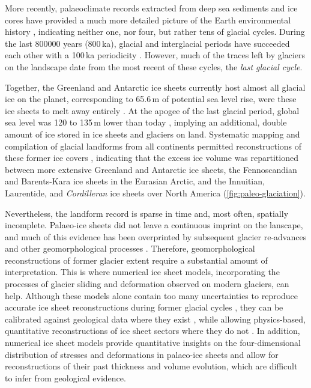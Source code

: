 \documentclass{article}
\begin{document}
More recently, palaeoclimate records extracted from deep sea sediments and ice
cores have provided a much more detailed picture of the Earth environmental
history \citep[e.g.,][]{Emiliani.1955, Shackleton.Opdyke.1973,
Dansgaard.etal.1993, Augustin.etal.2004}, indicating neither one, nor four, but
rather tens of glacial cycles. During the last 800000 years (800\,ka), glacial
and interglacial periods have succeeded each other with a 100\,ka periodicity
\citep[\cref{fig:paleo-timeseries};]{Hays.etal.1976, Augustin.etal.2004}.
However, much of the traces left by glaciers on the landscape date from the
most recent of these cycles, the \emph{last glacial cycle}.

Together, the Greenland and Antarctic ice sheets currently host almost all
glacial ice on the planet, corresponding to 65.6\,m of potential sea level
rise, were these ice sheets to melt away entirely \citep{Bamber.etal.2013,
Fretwell.etal.2013}. At the apogee of the last glacial period, global sea level
was 120 to 135\,m lower than today
\citep{Clark.Mix.2002}, implying an additional, double amount of ice stored in
ice sheets and glaciers on land. Systematic mapping and compilation of glacial
landforms from all continents \citep[e.g.,][]{Prest.etal.1968,
Boulton.Clark.1990, Kleman.etal.1997, Hattestrand.1998} permitted
reconstructions of these former ice covers \citep{Ehlers.Gibbard.2007},
indicating that the excess ice volume
was repartitioned between more extensive Greenland and Antarctic ice sheets,
the Fennoscandian and Barents-Kara ice sheets in the Eurasian Arctic, and the
Innuitian, Laurentide, and \emph{Cordilleran} ice
sheets over North America (\cref{fig:paleo-glaciation}).

Nevertheless, the landform record is sparse in time and, most often, spatially
incomplete. Palaeo-ice sheets did not leave a continuous imprint on the
lanscape, and much of this evidence has been overprinted by subsequent glacier
re-advances and other geomorphological processes \citep{Kleman.1994,
Kleman.etal.2006, Kleman.etal.2010}.
Therefore, geomorphological reconstructions of former glacier extent require a
substantial amount of interpretation. This is where numerical ice sheet models,
incorporating the processes of glacier sliding \citep[e.g.,][]{Weertman.1957}
and deformation \citep[e.g.,][]{Nye.1953} observed on modern glaciers, can
help. Although these models alone contain too many uncertainties to reproduce
accurate ice sheet reconstructions during former glacial cycles
\citep[e.g.,][]{Hebeler.etal.2008}, they can be calibrated against geological
data where they exist \citep{Napieralski.etal.2007}, while allowing
physics-based, quantitative reconstructions of ice sheet sectors where they do
not
\citep[e.g.,][]{Marshall.etal.2002, Tarasov.Peltier.2004}.
In addition, numerical ice sheet models provide quantitative insights on the
four-dimensional distribution of stresses and deformations in palaeo-ice sheets
and allow for reconstructions of their past thickness and volume evolution, which
are difficult to infer from geological evidence.
\end{document}
